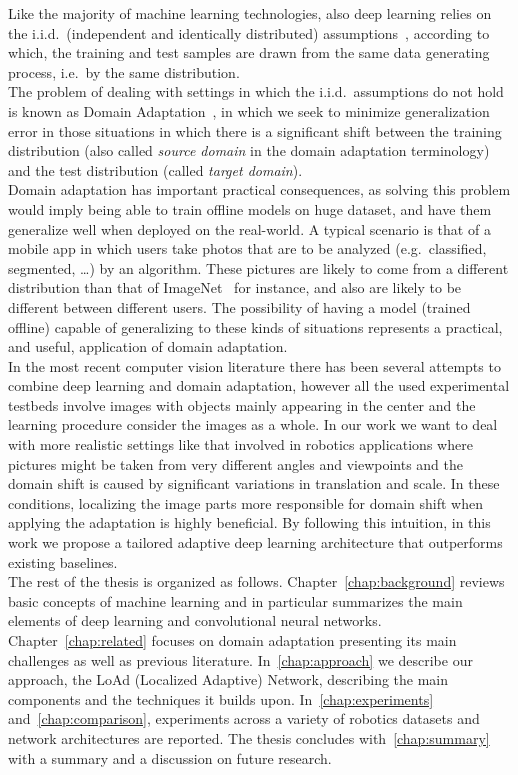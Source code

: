 \documentclass[../main.tex]{subfiles}
\begin{document}
    Like the majority of machine learning technologies, also deep learning relies on the i.i.d.\ (independent and identically distributed) assumptions~\cite{Vapnik1998}, according to which,
    the training and test samples are drawn
    from the same data generating process, i.e.\ by the same distribution. \\
	The problem of dealing with settings in which the i.i.d.\ assumptions
	do not hold is known as Domain Adaptation~\cite{domain-adaptation-review}, in which we seek to minimize generalization error
	in those situations in which there is a significant shift between the training distribution
    (also called \textit{source domain} in the domain adaptation terminology) and the test distribution (called \textit{target domain}). \\
    Domain adaptation has important practical consequences, as solving this problem would imply being able to train offline models
    on huge dataset, and have them generalize well when deployed on the real-world.
    A typical scenario is that of a mobile app in which users take photos that are to be analyzed (e.g.\ classified, segmented, \ldots) by
    an algorithm. These pictures are likely to come from a different distribution than that of ImageNet~\cite{imagenet} for instance,
    and also are likely to be different between different users.
    The possibility of having a model (trained offline) capable of generalizing to these kinds of situations represents a practical, and
    useful, application of domain adaptation. \\
    In the most recent computer vision literature there has been several attempts to combine deep learning and domain adaptation, however all the used experimental testbeds involve images with objects mainly appearing in the center and the learning procedure consider the images as a whole. In our work we want to deal with more realistic settings like that involved in robotics applications where pictures might be taken from very different angles and viewpoints and the domain shift is caused by significant variations in translation and scale. In these conditions, localizing the image parts more responsible for domain shift when applying the adaptation is highly beneficial. By following this intuition, in this work we propose a tailored adaptive deep learning architecture that outperforms existing baselines. \\
    The rest of the thesis is organized as follows. Chapter~\ref{chap:background} reviews basic concepts of machine learning and in particular summarizes the main elements of deep learning and convolutional neural networks. Chapter~\ref{chap:related} focuses on domain adaptation presenting its main challenges as well as previous literature.
    In~\autoref{chap:approach} we describe our approach, the LoAd (Localized Adaptive) Network, describing
    the main components and the techniques it builds upon. In~\autoref{chap:experiments} and~\autoref{chap:comparison},
    experiments across a variety of robotics datasets and network architectures are reported.
    The thesis concludes with~\autoref{chap:summary} with a summary and a discussion on future research.
\end{document}
